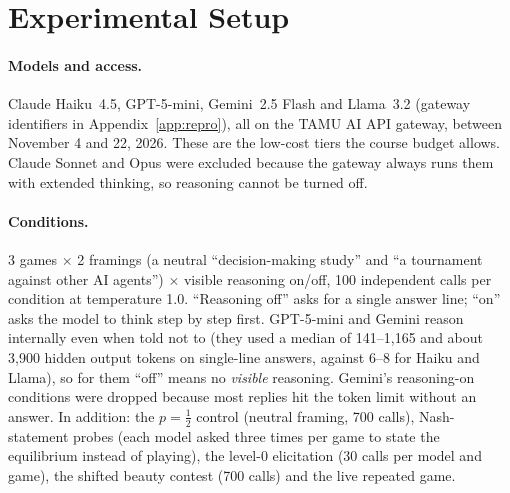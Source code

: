 \documentclass[11pt]{article}
\begin{document}
\section{Experimental Setup}\label{sec:setup}
\paragraph{Models and access.} Claude Haiku~4.5, GPT-5-mini, Gemini~2.5 Flash and Llama~3.2 (gateway identifiers in Appendix~\ref{app:repro}), all on the TAMU AI API gateway, between November 4 and 22, 2026. These are the low-cost tiers the course budget allows. Claude Sonnet and Opus were excluded because the gateway always runs them with extended thinking, so reasoning cannot be turned off.

\paragraph{Conditions.} 3 games $\times$ 2 framings (a neutral ``decision-making study'' and ``a tournament against other AI agents'') $\times$ visible reasoning on/off, 100 independent calls per condition at temperature 1.0. ``Reasoning off'' asks for a single answer line; ``on'' asks the model to think step by step first. GPT-5-mini and Gemini reason internally even when told not to (they used a median of 141--1{,}165 and about 3{,}900 hidden output tokens on single-line answers, against 6--8 for Haiku and Llama), so for them ``off'' means no \emph{visible} reasoning. Gemini's reasoning-on conditions were dropped because most replies hit the token limit without an answer. In addition: the $p=\tfrac12$ control (neutral framing, 700 calls), Nash-statement probes (each model asked three times per game to state the equilibrium instead of playing), the level-0 elicitation (30 calls per model and game), the shifted beauty contest (700 calls) and the live repeated game.
\end{document}
